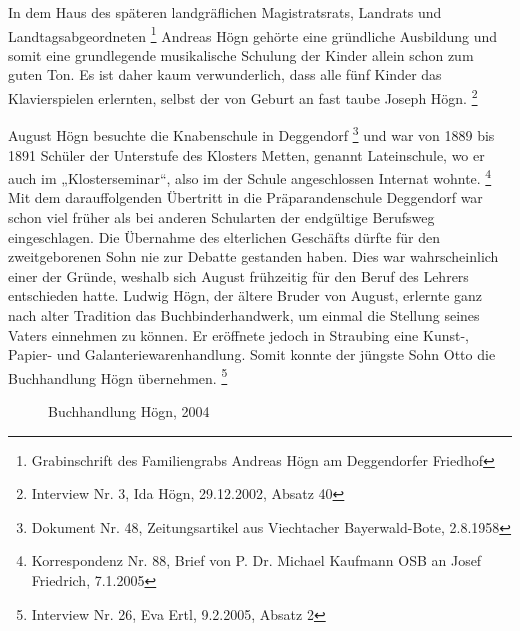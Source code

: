 In dem Haus des späteren landgräflichen Magistratsrats, Landrats und
Landtagsabgeordneten \footnote{Grabinschrift des Familiengrabs Andreas
Högn am Deggendorfer Friedhof} Andreas Högn gehörte eine gründliche
Ausbildung und somit eine grundlegende musikalische Schulung der Kinder
allein schon zum guten Ton. Es ist daher kaum verwunderlich, dass alle
fünf Kinder das Klavierspielen erlernten, selbst der von Geburt an fast
taube Joseph Högn. \footnote{Interview Nr. 3, Ida Högn, 29.12.2002,
Absatz 40}

August Högn besuchte die Knabenschule in Deggendorf \footnote{Dokument
Nr. 48, Zeitungsartikel aus Viechtacher Bayerwald-Bote, 2.8.1958} und
war von 1889 bis 1891 Schüler der Unterstufe des Klosters Metten,
genannt Lateinschule, wo er auch im „Klosterseminar“, also im der
Schule angeschlossen Internat wohnte. \footnote{Korrespondenz Nr. 88,
Brief von P. Dr. Michael Kaufmann OSB an Josef Friedrich, 7.1.2005} Mit
dem darauffolgenden Übertritt in die Präparandenschule Deggendorf war
schon viel früher als bei anderen Schularten der endgültige Berufsweg
eingeschlagen. Die Übernahme des elterlichen Geschäfts dürfte für den
zweitgeborenen Sohn nie zur Debatte gestanden haben. Dies war
wahrscheinlich einer der Gründe, weshalb sich August frühzeitig für den
Beruf des Lehrers entschieden hatte. Ludwig Högn, der ältere Bruder von
August, erlernte ganz nach alter Tradition das Buchbinderhandwerk, um
einmal die Stellung seines Vaters einnehmen zu können. Er eröffnete
jedoch in Straubing eine Kunst-, Papier- und Galanteriewarenhandlung.
Somit konnte der jüngste Sohn Otto die Buchhandlung Högn
übernehmen. \footnote{Interview Nr. 26, Eva Ertl, 9.2.2005, Absatz 2}

\begin{figure}
\caption{Buchhandlung Högn, 2004}
\end{figure}
